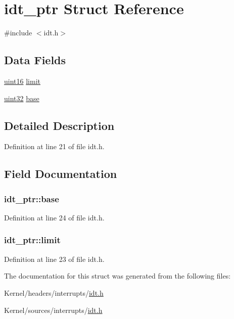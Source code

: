 \hypertarget{structidt__ptr}{
\section{idt\_\-ptr Struct Reference}
\label{structidt__ptr}
}


{\ttfamily \#include $<$idt.h$>$}

\subsection*{Data Fields}
\begin{DoxyCompactItemize}
\item 
\hyperlink{int__types_8h_a05f6b0ae8f6a6e135b0e290c25fe0e4e}{uint16} \hyperlink{structidt__ptr_a196faad3dd3d048253d6fce865394ce2}{limit}
\item 
\hyperlink{int__types_8h_a1134b580f8da4de94ca6b1de4d37975e}{uint32} \hyperlink{structidt__ptr_abdbb2c32c443879e2cf15cd32ec0c758}{base}
\end{DoxyCompactItemize}


\subsection{Detailed Description}


Definition at line 21 of file idt.h.



\subsection{Field Documentation}
\hypertarget{structidt__ptr_abdbb2c32c443879e2cf15cd32ec0c758}{
\subsubsection[{base}]{ {\bf idt\_\-ptr::base}}}
\label{structidt__ptr_abdbb2c32c443879e2cf15cd32ec0c758}


Definition at line 24 of file idt.h.

\hypertarget{structidt__ptr_a196faad3dd3d048253d6fce865394ce2}{
\subsubsection[{limit}]{ {\bf idt\_\-ptr::limit}}}
\label{structidt__ptr_a196faad3dd3d048253d6fce865394ce2}


Definition at line 23 of file idt.h.



The documentation for this struct was generated from the following files:\begin{DoxyCompactItemize}
\item 
Kernel/headers/interrupts/\hyperlink{headers_2interrupts_2idt_8h}{idt.h}\item 
Kernel/sources/interrupts/\hyperlink{sources_2interrupts_2idt_8h}{idt.h}\end{DoxyCompactItemize}
